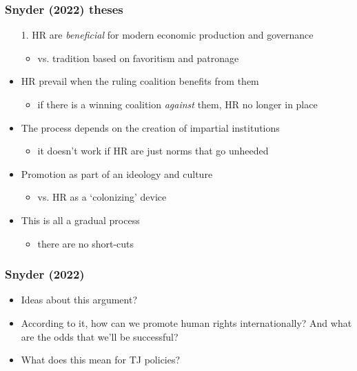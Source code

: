 \documentclass[aspectratio=43]{beamer}
\begin{document}
\begin{frame}
\frametitle{Snyder (2022) theses}
\centering

\begin{itemize}
  \item[1.] HR are \textit{beneficial} for modern economic production and governance
  \begin{itemize}
    \item vs. tradition based on favoritism and patronage
  \end{itemize}
  \item<2->[2.] HR prevail when the ruling coalition benefits from them
  \begin{itemize}
    \item if there is a winning coalition \textit{against} them, HR no longer in place
  \end{itemize}
  \item<3->[3.] The process depends on the creation of impartial institutions
  \begin{itemize}
    \item it doesn't work if HR are just norms that go unheeded
  \end{itemize}
  \item<4->[4.] Promotion as part of an ideology and culture
  \begin{itemize}
    \item vs. HR as a `colonizing' device
  \end{itemize}
  \item<5->[5.] This is all a gradual process
  \begin{itemize}
    \item there are no short-cuts
  \end{itemize}
\end{itemize}

\end{frame}

\begin{frame}
\frametitle{Snyder (2022)}
\centering

\begin{itemize}
  \item Ideas about this argument?
  \item According to it, how can we promote human rights internationally? And what are the odds that we'll be successful?
  \item<2-> What does this mean for TJ policies?
\end{itemize}

\end{frame}
\end{document}
